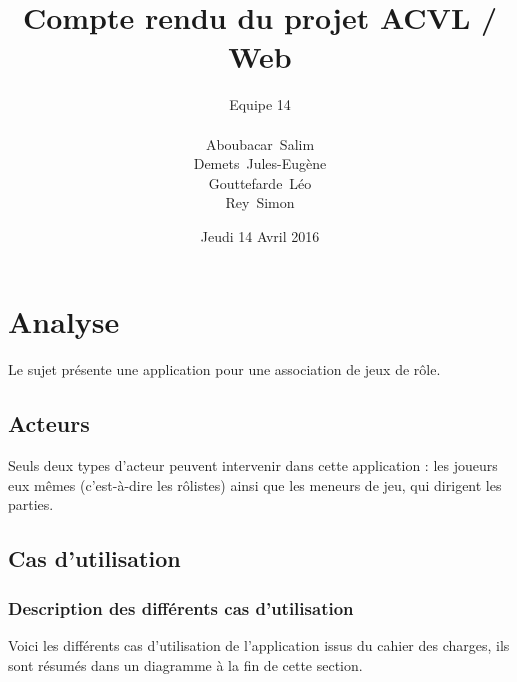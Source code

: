 \documentclass[a4paper, 11pt, titlepage]{article}
\title {{ {\huge Compte rendu du projet ACVL / Web }} }
\author{\Large Equipe 14 \\
\\
    {\sc Aboubacar}~Salim\\
    {\sc Demets}~Jules-Eugène\\
    {\sc Gouttefarde}~Léo\\
    {\sc Rey}~Simon
}
\date{Jeudi 14 Avril 2016}
\begin{document}
\pagestyle{fancy}
\maketitle

\tableofcontents
\newpage




\section {Analyse}


Le sujet présente une application pour une association de jeux de rôle. 

\subsection{Acteurs}

Seuls deux types d'acteur peuvent intervenir dans cette application : les joueurs eux mêmes (c'est-à-dire les rôlistes) ainsi que les meneurs de jeu, qui dirigent les parties.

\subsection{Cas d'utilisation}

\subsubsection{Description des différents cas d'utilisation}

Voici les différents cas d'utilisation de l'application issus du cahier des charges, ils sont résumés dans un diagramme à la fin de cette section.
\end{document}
